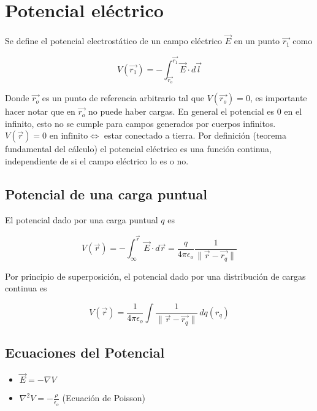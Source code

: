 
\section{Potencial eléctrico}

Se define el potencial electrostático de un campo eléctrico $\Vec{E}$ en un punto $\Vec{r_1}$ como

\[V(\Vec{r_1}) = -\int^{\Vec{r_1}}_{\Vec{r_o}}\Vec{E}\cdot d\Vec{l}\]

Donde $\Vec{r_o}$ es un punto de referencia arbitrario tal que $V(\Vec{r_o})=0$, es importante hacer notar que en $\Vec{r_o}$ no puede haber cargas. En general el potencial es 0 en el infinito, esto no se cumple para campos generados por cuerpos infinitos. 
\medbreak
$V(\Vec{r}) = 0 \text{ en infinito} \iff$ estar conectado a tierra. 
\medbreak
Por definición (teorema fundamental del cálculo) el potencial eléctrico es una función continua, independiente de si el campo eléctrico lo es o no.

\subsection{Potencial de una carga puntual}

El potencial dado por una carga puntual $q$ es

\[V(\Vec{r}) = -\int^{\Vec{r}}_{\infty}\Vec{E}\cdot d\Vec{r} = \frac{q}{4\pi\epsilon_o}\frac{1}{\parallel\Vec{r}-\Vec{r_q}\parallel}\]

Por principio de superposición, el potencial dado por una distribución de cargas continua es

\[V(\Vec{r}) = \frac{1}{4\pi\epsilon_o}\int\frac{1}{\parallel\Vec{r}-\Vec{r_q}\parallel}\,dq(r_q)\]

\subsection{Ecuaciones del Potencial}

\begin{itemize}
    \item $\Vec{E} = -\nabla V$
    \item $\nabla^2V = -\frac{\rho}{\epsilon_o}$ (Ecuación de Poisson)
\end{itemize}


